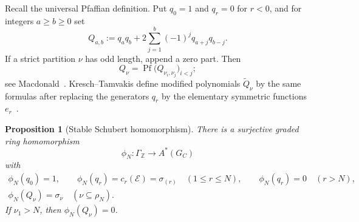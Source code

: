 \documentclass[11pt,a4paper,oneside]{amsart}
\numberwithin{equation}{section}
\newtheorem{proposition}[theorem]{Proposition}
\theoremstyle{definition}
\theoremstyle{remark}
\newcommand{\Z}{\mathbb Z}
\newcommand{\cE}{\mathcal E}
\begin{document}
Recall the universal Pfaffian definition.  Put $q_0=1$ and $q_r=0$ for $r<0$, and for integers $a\geq b\geq0$ set
\begin{equation}\label{eq:Q-two-row}
 Q_{a,b}:=q_aq_b+2\sum_{j=1}^{b}(-1)^j q_{a+j}q_{b-j}.
\end{equation}
If a strict partition $\nu$ has odd length, append a zero part.  Then
\begin{equation}\label{eq:Q-Pfaffian}
 Q_\nu=\operatorname{Pf}\bigl(Q_{\nu_i,\nu_j}\bigr)_{i<j};
\end{equation}
see Macdonald~\cite[Chapter~III, Section~8]{Macdonald}.  Kresch--Tamvakis define modified polynomials $\widetilde Q_\nu$ by the same formulas after replacing the generators $q_r$ by the elementary symmetric functions $e_r$~\cite[Section~2, equations~(1)--(2)]{KT03}.

\begin{proposition}[Stable Schubert homomorphism]\label{prop:stable-map}
There is a surjective graded ring homomorphism
\begin{equation}\label{eq:stable-map}
 \phi_N:\Gamma_{\Z}\longrightarrow A^*(G_C)
\end{equation}
with
\begin{equation}\label{eq:stable-map-values}
\begin{gathered}
 \phi_N(q_0)=1,\qquad
 \phi_N(q_r)=c_r(\cE)=\sigma_{(r)}\quad(1\leq r\leq N),\qquad
 \phi_N(q_r)=0\quad(r>N),\\
 \phi_N(Q_\nu)=\sigma_\nu\quad(\nu\subseteq\rho_N).
\end{gathered}
\end{equation}
If $\nu_1>N$, then $\phi_N(Q_\nu)=0$.
\end{proposition}
\end{document}
